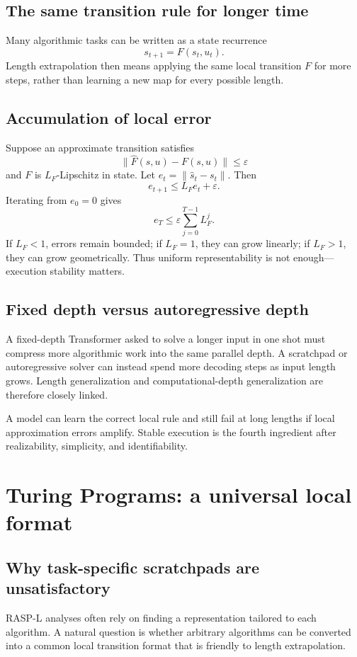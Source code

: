 \documentclass[11pt,a4paper,oneside,openany]{memoir}
\theoremstyle{definition}
\begin{document}
\section{The same transition rule for longer time}
Many algorithmic tasks can be written as a state recurrence
\[
s_{t+1}=F(s_t,u_t).
\]
Length extrapolation then means applying the same local transition $F$ for more steps, rather than learning a new map for every possible length.

\section{Accumulation of local error}
Suppose an approximate transition satisfies
\[
\|\widehat F(s,u)-F(s,u)\|\le\varepsilon
\]
and $F$ is $L_F$-Lipschitz in state.  Let $e_t=\|\hat s_t-s_t\|$.  Then
\[
e_{t+1}\le L_F e_t+\varepsilon.
\]
Iterating from $e_0=0$ gives
\[
\boxed{e_T\le\varepsilon\sum_{j=0}^{T-1}L_F^j.}
\]
If $L_F<1$, errors remain bounded; if $L_F=1$, they can grow linearly; if $L_F>1$, they can grow geometrically.  Thus uniform representability is not enough---execution stability matters.

\section{Fixed depth versus autoregressive depth}
A fixed-depth Transformer asked to solve a longer input in one shot must compress more algorithmic work into the same parallel depth.  A scratchpad or autoregressive solver can instead spend more decoding steps as input length grows.  Length generalization and computational-depth generalization are therefore closely linked.

\begin{presentbox}
A model can learn the correct local rule and still fail at long lengths if local approximation errors amplify.  Stable execution is the fourth ingredient after realizability, simplicity, and identifiability.
\end{presentbox}

\chapter{Turing Programs: a universal local format}
\section{Why task-specific scratchpads are unsatisfactory}
RASP-L analyses often rely on finding a representation tailored to each algorithm.  A natural question is whether arbitrary algorithms can be converted into a common local transition format that is friendly to length extrapolation.
\end{document}

